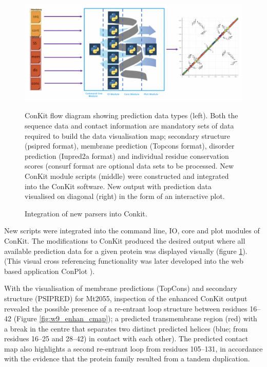\begin{figure}[th!]
    \centering
    \includegraphics[width=\textwidth]{Results/conkit.png}
    \caption{Integration of new parsers into Conkit.}
    \label{fig:conplot}
    \small
    ConKit flow diagram showing prediction data types (left). Both the sequence data and contact information are mandatory sets of data required to build the data visualisation map; secondary structure (psipred format), membrane prediction (Topcons format), disorder prediction (Iupred2a format) and individual residue conservation scores (consurf format are optional data sets to be processed. New ConKit module scripts (middle) were constructed and integrated into the ConKit software. New output with prediction data visualised on diagonal (right) in the form of an interactive plot.
\end{figure}

New scripts were integrated into the command line, IO, core and plot modules of ConKit. The modifications to ConKit produced the desired output where all available prediction data for a given protein was displayed visually (figure \ref{fig:conplot}). (This visual cross referencing functionality was later developed into the web based application ConPlot \cite{sanchez2021conplot}).

With the visualisation of membrane predictions (TopCons) and secondary structure (PSIPRED) for Mt2055, inspection of the enhanced ConKit output revealed the possible presence of a re-entrant loop structure between residues 16–42 (Figure \ref{fig:w9_enhan_cmap}); a predicted transmembrane region (red) with a break in the centre that separates two distinct predicted helices (blue; from residues 16–25 and 28–42) in contact with each other). The predicted contact map also highlights a second re-entrant loop from residues 105–131, in accordance with the evidence that the protein family resulted from a tandem duplication. 

